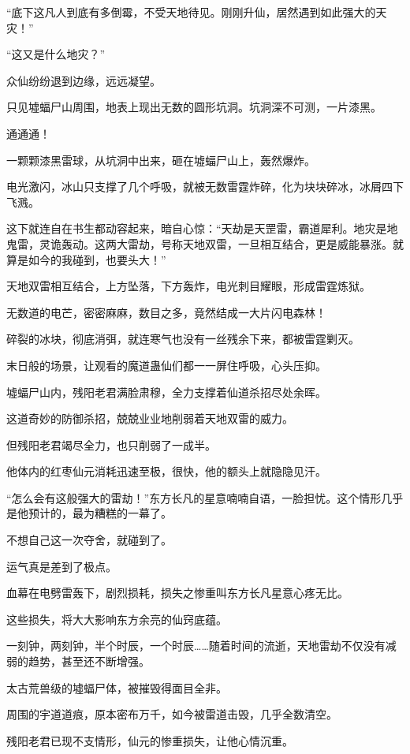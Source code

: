 \begin{this_body}
“底下这凡人到底有多倒霉，不受天地待见。刚刚升仙，居然遇到如此强大的天灾！”

“这又是什么地灾？”

众仙纷纷退到边缘，远远凝望。

只见墟蝠尸山周围，地表上现出无数的圆形坑洞。坑洞深不可测，一片漆黑。

通通通！

一颗颗漆黑雷球，从坑洞中出来，砸在墟蝠尸山上，轰然爆炸。

电光激闪，冰山只支撑了几个呼吸，就被无数雷霆炸碎，化为块块碎冰，冰屑四下飞溅。

这下就连自在书生都动容起来，暗自心惊：“天劫是天罡雷，霸道犀利。地灾是地鬼雷，灵诡轰动。这两大雷劫，号称天地双雷，一旦相互结合，更是威能暴涨。就算是如今的我碰到，也要头大！”

天地双雷相互结合，上方坠落，下方轰炸，电光刺目耀眼，形成雷霆炼狱。

无数道的电芒，密密麻麻，数目之多，竟然结成一大片闪电森林！

碎裂的冰块，彻底消弭，就连寒气也没有一丝残余下来，都被雷霆剿灭。

末日般的场景，让观看的魔道蛊仙们都一一屏住呼吸，心头压抑。

墟蝠尸山内，残阳老君满脸肃穆，全力支撑着仙道杀招尽处余晖。

这道奇妙的防御杀招，兢兢业业地削弱着天地双雷的威力。

但残阳老君竭尽全力，也只削弱了一成半。

他体内的红枣仙元消耗迅速至极，很快，他的额头上就隐隐见汗。

“怎么会有这般强大的雷劫！”东方长凡的星意喃喃自语，一脸担忧。这个情形几乎是他预计的，最为糟糕的一幕了。

不想自己这一次夺舍，就碰到了。

运气真是差到了极点。

血幕在电劈雷轰下，剧烈损耗，损失之惨重叫东方长凡星意心疼无比。

这些损失，将大大影响东方余亮的仙窍底蕴。

一刻钟，两刻钟，半个时辰，一个时辰……随着时间的流逝，天地雷劫不仅没有减弱的趋势，甚至还不断增强。

太古荒兽级的墟蝠尸体，被摧毁得面目全非。

周围的宇道道痕，原本密布万千，如今被雷道击毁，几乎全数清空。

残阳老君已现不支情形，仙元的惨重损失，让他心情沉重。


\end{this_body}
